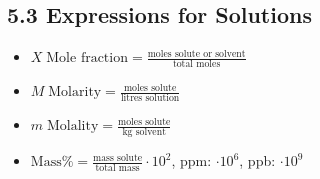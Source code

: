 \subsection{5.3 Expressions for Solutions}
\begin{itemize}
    \item $X \; \textrm{Mole fraction} = \frac{\textrm{moles solute or solvent}}{\textrm{total moles}}$
    \item $M \; \textrm{Molarity} = \frac{\textrm{moles solute}}{\textrm{litres solution}}$
    \item $m \; \textrm{Molality} = \frac{\textrm{moles solute}}{\textrm{kg solvent}}$
    \item $\textrm{Mass} \% = \frac{\textrm{mass solute}}{\textrm{total mass}} \cdot 10^2$, ppm: $\cdot 10^6$, ppb: $\cdot 10^9$
\end{itemize}